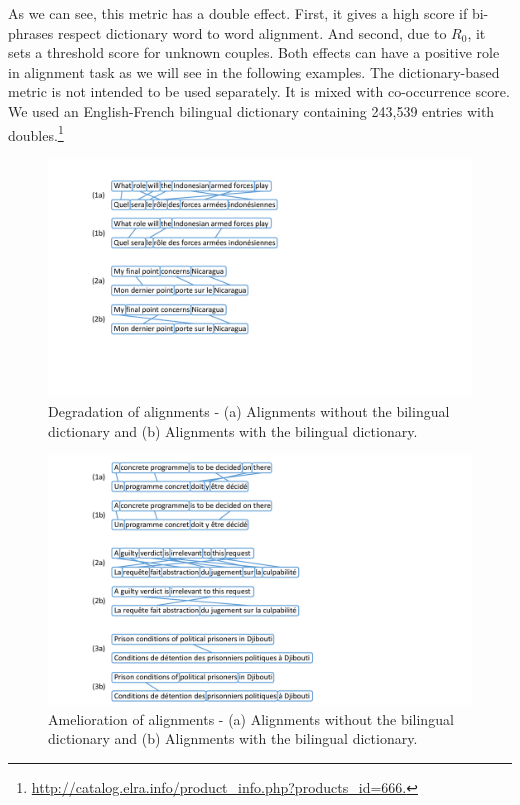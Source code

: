 \documentclass[output=paper,modfonts,nonflat]{langsci/langscibook}
\begin{document}
As we can see, this metric has a double effect. 
First, it gives a high score if bi-phrases respect dictionary word to word alignment. 
And second, due to $R_0$, it sets a threshold score for unknown couples. 
Both effects can have a positive role in alignment task as we will see in the following examples. The dictionary-based metric is not intended to be used separately. It is mixed with 
co-occurrence score. We used an English-French bilingual dictionary containing 243,539 entries with doubles.\footnote{\url{http://catalog.elra.info/product_info.php?products_id=666.}}

\begin{figure}
\centering
\includegraphics[width=0.6\linewidth]{figures/Figure_degAli}
\caption{\label{fig:degali}Degradation of alignments - (a) Alignments without the bilingual dictionary and (b) Alignments with the bilingual dictionary.}
\end{figure}

\begin{figure}
\centering
\includegraphics[width=0.7\linewidth]{figures/Figure_impAli-}
\caption{\label{fig:improvali}Amelioration of alignments - (a) Alignments without the bilingual dictionary and (b) Alignments with the bilingual dictionary.}
\end{figure}
\end{document}
